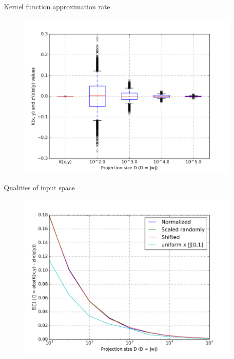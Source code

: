 \documentclass[unknownkeysallowed]{beamer}
\begin{document}
\begin{frame}{Kernel function approximation rate}
\begin{figure}
\includegraphics[scale=0.45]{img/test_precision_interval_delta_}
\end{figure}
\end{frame}

\begin{frame}{Qualities of input space}
\begin{figure}
\includegraphics[scale=0.45]{img/fig_input_}
\end{figure}
\end{frame}
\end{document}
